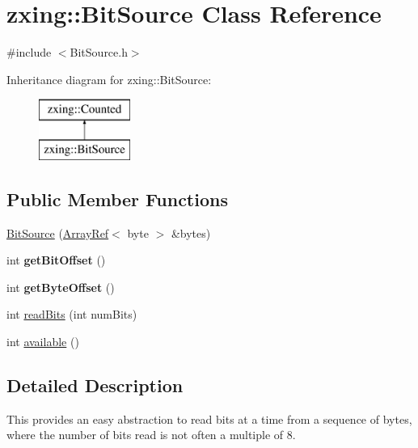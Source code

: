 \hypertarget{classzxing_1_1_bit_source}{}\section{zxing\+:\+:Bit\+Source Class Reference}
\label{classzxing_1_1_bit_source}


{\ttfamily \#include $<$Bit\+Source.\+h$>$}

Inheritance diagram for zxing\+:\+:Bit\+Source\+:\begin{figure}[H]
\begin{center}
\leavevmode
\includegraphics[height=2.000000cm]{classzxing_1_1_bit_source}
\end{center}
\end{figure}
\subsection*{Public Member Functions}
\begin{DoxyCompactItemize}
\item 
\mbox{\hyperlink{classzxing_1_1_bit_source_a65d6281c4c8eb6a069e49cbb4d8ab775}{Bit\+Source}} (\mbox{\hyperlink{classzxing_1_1_array_ref}{Array\+Ref}}$<$ byte $>$ \&bytes)
\item 
\mbox{\label{classzxing_1_1_bit_source_ae69f0293dfc003087313fb6a8924d399}} 
int {\bfseries get\+Bit\+Offset} ()
\item 
\mbox{\label{classzxing_1_1_bit_source_ae27073069e7a7d3dfdb4912d30e4d453}} 
int {\bfseries get\+Byte\+Offset} ()
\item 
int \mbox{\hyperlink{classzxing_1_1_bit_source_abe5162247749e9d9eeb9afcec8738252}{read\+Bits}} (int num\+Bits)
\item 
int \mbox{\hyperlink{classzxing_1_1_bit_source_a9fd3c660b77ad591ceb0da69dd43566d}{available}} ()
\end{DoxyCompactItemize}


\subsection{Detailed Description}
This provides an easy abstraction to read bits at a time from a sequence of bytes, where the number of bits read is not often a multiple of 8.

